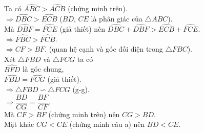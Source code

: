 \begin{bt}
{\begin{enumerate}
{
			}
			Ta có $\widehat{ABC}>\widehat{ACB}$ (chứng minh trên).\\
			$\Rightarrow \widehat{DBC}>\widehat{ECB}$ ($BD$, $CE$ là phân giác của $\triangle ABC$).\\
			Mà $\widehat{DBF}=\widehat{FCE}$ (giả thiết) nên $\widehat{DBC}+\widehat{DBF}>\widehat{ECB}+\widehat{FCE}$.\\
			$\Rightarrow \widehat{FBC}>\widehat{FCB}$.\\
			$\Rightarrow CF>BF$. (quan hệ cạnh và góc đối diện trong $\triangle FBC$).\\
			Xét $\triangle FBD$ và $\triangle FCG$ ta có\\
			$\widehat{BFD}$ là góc chung,\\
			$\widehat{FBD}=\widehat{FCG}$ (giả thiết).\\
			$\Rightarrow \triangle FBD \backsim \triangle FCG$ (g-g).\\
			$\Rightarrow \dfrac{BD}{CG}=\dfrac{BF}{CF}$.\\
			Mà $CF>BF$ (chứng minh trên) nên $CG>BD$.\\
			Mặt khác $CG<CE$ (chứng minh câu a) nên $BD<CE$.
		\end{enumerate}
	}
\end{bt}

